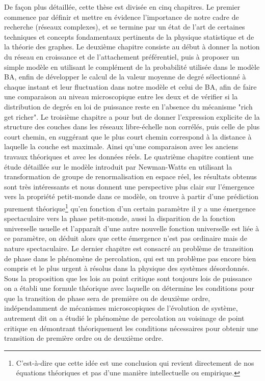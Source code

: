 De façon plus détaillée, cette thèse est divisée en cinq chapitres. Le premier commence par définir et mettre en évidence l'importance de notre cadre de recherche (réseaux complexes), et se termine par un état de l'art de  certaines techniques et concepts fondamentaux pertinents de la physique statistique et de la théorie des graphes. Le deuxième chapitre consiste au début à donner la notion du réseau en croissance et de l'attachement préférentiel, puis à proposer un simple modèle en utilisant le complément de la probabilité utilisée dans le modèle BA, enfin de développer le calcul de la valeur moyenne de degré sélectionné à chaque instant et leur fluctuation dans notre modèle et celui de BA, afin de faire une comparaison au niveau microscopique entre les deux et de vérifier si la distribution de degrés en loi de puissance reste en l'absence du mécanisme "rich get richer". Le troisième chapitre a pour but de donner l'expression explicite de la structure des couches dans les réseaux libre-échelle non corrélés, puis celle de plus court chemin, en suggérant que le plus court chemin correspond à la distance à laquelle la couche est maximale. Ainsi qu'une comparaison avec les anciens travaux théoriques et avec les données réels. Le quatrième chapitre contient une étude détaillée sur le modèle introduit par Newman-Watts en utilisant la transformation de groupe de renormalisation en espace réel, les résultats obtenus sont très intéressants et nous donnent une  perspective plus clair sur l'émergence vers la propriété petit-monde dans ce modèle, on trouve à partir d'une prédiction purement théorique\footnote{ 
C'est-à-dire que cette idée est une conclusion qui revient directement de nos équations théoriques et pas d'une manière intellectuelle ou empirique.} qu'en fonction d'un certain paramètre il y a une émergence spectaculaire vers la phase petit-monde, aussi la disparition de la fonction universelle usuelle   et l'apparaît d'une autre nouvelle fonction universelle est liée à ce paramètre, on déduit alors que cette émergence n'est pas ordinaire mais de nature spectaculaire. Le dernier chapitre est consacré au problème de transition de phase dans le phénomène de percolation,  qui est un problème pas encore bien compris et le plus urgent à résolus dans la physique des systèmes désordonnés. Sous la proposition que les lois au point critique sont toujours lois de puissance on a établi une formule théorique avec laquelle on détermine les conditions pour que la transition de phase sera de première ou de deuxième ordre, indépendamment de mécanismes microscopiques de l'évolution de système, autrement dit on a étudié le phénomène de percolation au voisinage de point critique en démontrant théoriquement les conditions nécessaires pour obtenir une transition de première ordre ou de deuxième ordre.\\

